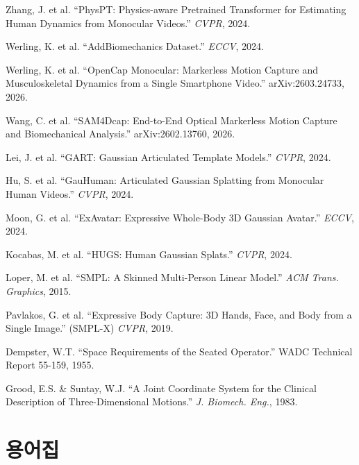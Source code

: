 \documentclass[11pt, a4paper]{report}
\begin{document}
\begin{enumerate}[leftmargin=*, label={[\arabic*]}]
  \item Zhang, J. et al. ``PhysPT: Physics-aware Pretrained Transformer for Estimating Human Dynamics from Monocular Videos.'' \textit{CVPR}, 2024.

  \item Werling, K. et al. ``AddBiomechanics Dataset.'' \textit{ECCV}, 2024.

  \item Werling, K. et al. ``OpenCap Monocular: Markerless Motion Capture and Musculoskeletal Dynamics from a Single Smartphone Video.'' arXiv:2603.24733, 2026.

  \item Wang, C. et al. ``SAM4Dcap: End-to-End Optical Markerless Motion Capture and Biomechanical Analysis.'' arXiv:2602.13760, 2026.

  \item Lei, J. et al. ``GART: Gaussian Articulated Template Models.'' \textit{CVPR}, 2024.

  \item Hu, S. et al. ``GauHuman: Articulated Gaussian Splatting from Monocular Human Videos.'' \textit{CVPR}, 2024.

  \item Moon, G. et al. ``ExAvatar: Expressive Whole-Body 3D Gaussian Avatar.'' \textit{ECCV}, 2024.

  \item Kocabas, M. et al. ``HUGS: Human Gaussian Splats.'' \textit{CVPR}, 2024.

  \item Loper, M. et al. ``SMPL: A Skinned Multi-Person Linear Model.'' \textit{ACM Trans. Graphics}, 2015.

  \item Pavlakos, G. et al. ``Expressive Body Capture: 3D Hands, Face, and Body from a Single Image.'' (SMPL-X) \textit{CVPR}, 2019.

  \item Dempster, W.T. ``Space Requirements of the Seated Operator.'' WADC Technical Report 55-159, 1955.

  \item Grood, E.S. \& Suntay, W.J. ``A Joint Coordinate System for the Clinical Description of Three-Dimensional Motions.'' \textit{J. Biomech. Eng.}, 1983.
\end{enumerate}


\chapter*{용어집}
\end{document}
